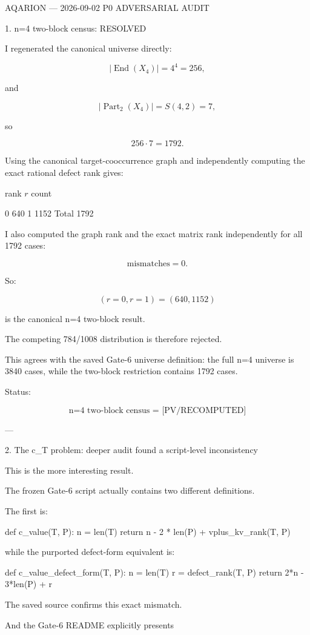 AQARION — 2026-09-02 P0 ADVERSARIAL AUDIT

1. n=4 two-block census: RESOLVED

I regenerated the canonical universe directly:

\[
|\operatorname{End}(X_4)|=4^4=256,
\]

and

\[
|\operatorname{Part}_2(X_4)|=S(4,2)=7,
\]

so

\[
256\cdot7=1792.
\]

Using the canonical target-cooccurrence graph and independently computing the exact rational defect rank gives:

rank \(r\)	count

0	640
1	1152
Total	1792


I also computed the graph rank and the exact matrix rank independently for all 1792 cases:

\[
\boxed{\text{mismatches}=0}.
\]

So:

\[
\boxed{(r=0,r=1)=(640,1152)}
\]

is the canonical n=4 two-block result.

The competing 784/1008 distribution is therefore rejected.

This agrees with the saved Gate-6 universe definition: the full n=4 universe is 3840 cases, while the two-block restriction contains 1792 cases. 

Status:

\[
\boxed{\text{n=4 two-block census = [PV/RECOMPUTED]}}
\]


---

2. The c_T problem: deeper audit found a script-level inconsistency

This is the more interesting result.

The frozen Gate-6 script actually contains two different definitions.

The first is:

def c_value(T, P):
    n = len(T)
    return n - 2 * len(P) + vplus_kv_rank(T, P)

while the purported defect-form equivalent is:

def c_value_defect_form(T, P):
    n = len(T)
    r = defect_rank(T, P)
    return 2*n - 3*len(P) + r

The saved source confirms this exact mismatch. 

And the Gate-6 README explicitly presents

